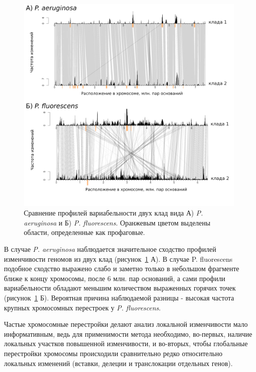 \begin{figure}[!ht] 
  \center
    \includegraphics[width=\textwidth]{Dissertation/images/complexity/pseudo_complexity.png}
  \caption{Сравнение профилей вариабельности двух клад вида  А) \textit{P. aeruginosa} и Б) \textit{P. fluorescens}. Оранжевым цветом выделены области, определенные как профаговые.}
  \label{img:pseudo_complexity} 
\end{figure}

В случае \textit{P. aeruginosa} наблюдается значительное сходство профилей изменчивости геномов из двух клад (рисунок~\ref{img:pseudo_complexity} А). В случае {P. fluorescens} подобное сходство выражено слабо и заметно только в небольшом фрагменте ближе к концу хромосомы, после 6 млн. пар оснований, а сами профили вариабельности обладают меньшим количеством выраженных горячих точек (рисунок~\ref{img:pseudo_complexity} Б). Вероятная причина наблюдаемой разницы - высокая частота крупных хромосомных перестроек у \textit{P. fluorescens}. 

Частые хромосомные перестройки делают анализ локальной изменчивости мало информативным, ведь для применимости метода необходимо, во-первых, наличие локальных участков повышенной изменчивости, и во-вторых, чтобы глобальные перестройки хромосомы происходили сравнительно редко относительно локальных изменений (вставки, делеции и транслокации отдельных генов).

